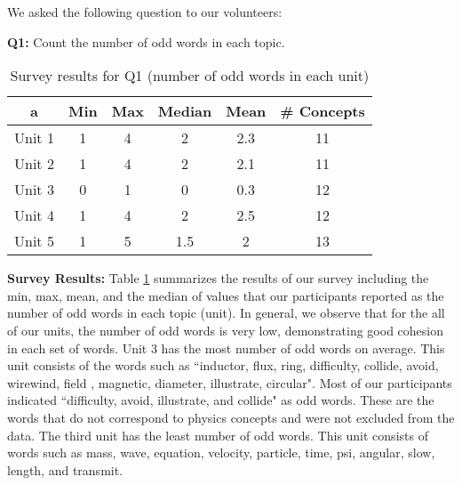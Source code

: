 We asked the following question to our volunteers:

\textbf{Q1:}  Count the number of odd words in each topic.  

\begin {table}
\footnotesize
\begin{center}
 \begin{tabular}{c c c c c c } 
 \hline
 \textbf{a} & \textbf{Min}  & \textbf{Max} & \textbf{Median} & \textbf{Mean} & \textbf{\# Concepts}\\ \hline %
 Unit 1 & 1 & 4 & 2 & 2.3 & 11  \\
 Unit 2 & 1 & 4 & 2 & 2.1 &  11\\
 Unit 3 & 0 & 1 & 0 & 0.3 &  12\\
 Unit 4 & 1 & 4 & 2 & 2.5 &  12\\
 Unit 5 & 1 & 5 & 1.5 & 2 &   13\\
 \hline
\end{tabular}
\caption {\label{table_survey}Survey results for Q1 (number of odd words in each unit)}
\end{center}
\end {table}

\textbf{Survey Results:}
Table \ref{table_survey} summarizes the results of our survey including the min, max, mean,
and the median of values that our participants reported as the number
of odd words in each topic (unit).
In general, we observe that for the all of our units, the number of odd words is very low, demonstrating
good cohesion in each set of words. Unit 3 has the most number of odd words on average. This unit
consists of the words such as ``inductor, flux, ring,  difficulty, collide, avoid, wirewind, field ,
magnetic, diameter,  illustrate, circular". Most of our participants indicated ``difficulty, avoid,
illustrate, and collide" as odd words. These are the words that do not correspond to physics concepts and were not
excluded from the data. The third unit has the least number of odd words. This unit consists of words
such as mass, wave, equation, velocity, particle, time, psi, angular, slow, length, and transmit. 

